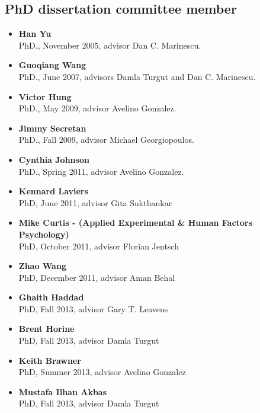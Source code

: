     
\subsection*{PhD dissertation committee member}

\begin{itemize}    
\item\textbf{Han Yu}\\
    PhD., November 2005, advisor Dan C. Marinescu.
    
\item\textbf{Guoqiang Wang}\\
    PhD., June 2007, advisors Damla Turgut and Dan C. Marinescu.
    
\item\textbf{Victor Hung}\\
PhD., May 2009, advisor Avelino Gonzalez.

\item\textbf{Jimmy Secretan}\\
PhD., Fall 2009, advisor Michael Georgiopoulos.

\item\textbf{Cynthia Johnson}\\
PhD., Spring 2011, advisor Avelino Gonzalez.

\item\textbf{Kennard Laviers}\\
PhD, June 2011, advisor Gita Sukthankar

\item\textbf{Mike Curtis - (Applied Experimental \& Human Factors Psychology)}\\
PhD, October 2011, advisor Florian Jentsch

\item\textbf{Zhao Wang}\\
PhD, December 2011, advisor Aman Behal

\item\textbf{Ghaith Haddad}\\
PhD, Fall 2013, advisor Gary T. Leavens

\item\textbf{Brent Horine}\\
PhD, Fall 2013, advisor Damla Turgut

\item\textbf{Keith Brawner}\\
PhD, Summer 2013, advisor Avelino Gonzalez

\item\textbf{Mustafa Ilhan Akbas}\\
PhD, Fall 2013, advisor Damla Turgut


\end{itemize}
